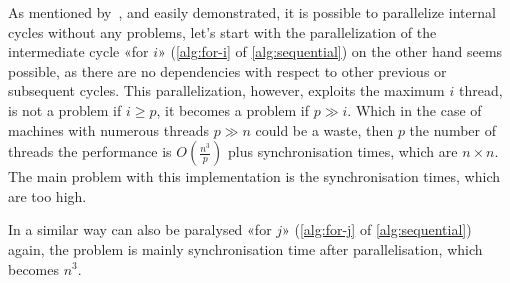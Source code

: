 As mentioned by~\cite{rucci}, and easily demonstrated, it is possible to parallelize internal cycles without any problems, let's start with the parallelization of  the intermediate cycle «for \(i\)» (\cref{alg:for-i} of \cref{alg:sequential}) on the other hand seems possible, as there are no dependencies with respect to other previous or subsequent cycles.
This parallelization, however, exploits the maximum \(i\) thread, is not a problem if \(i \geq p\), it becomes a problem if \(p \gg i\).
Which in the case of machines with numerous threads \(p \gg n\) could be a waste, then \(p\) the number of threads the performance is \(\displaystyle O\left(\frac{n^3}{p}\right)\) plus synchronisation times, which are \(n\times n\).
The main problem with this implementation is the synchronisation times, which are too high.

In a similar way can also be paralysed «for \(j\)» (\cref{alg:for-j} of \cref{alg:sequential}) again, the problem is mainly synchronisation time after parallelisation, which becomes \(n^3\).

\FloatBarrier